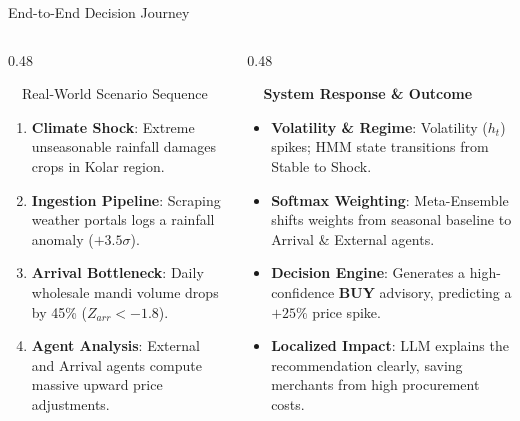 \documentclass{beamer}
\begin{document}
\begin{frame}{End-to-End Decision Journey}
\vspace{-0.2cm}

\begin{columns}[T]
    \begin{column}{0.48\textwidth}
        \begin{infocard}{~~Real-World Scenario Sequence}
            \fontsize{6.8pt}{8.5pt}\selectfont
            \begin{enumerate}\setlength\itemsep{3pt}\setlength\parskip{0pt}
                \item[\textbf{1.}] \textbf{Climate Shock}: Extreme unseasonable rainfall damages crops in Kolar region.
                \item[\textbf{2.}] \textbf{Ingestion Pipeline}: Scraping weather portals logs a rainfall anomaly ($+3.5\sigma$).
                \item[\textbf{3.}] \textbf{Arrival Bottleneck}: Daily wholesale mandi volume drops by 45\% ($Z_{arr} < -1.8$).
                \item[\textbf{4.}] \textbf{Agent Analysis}: External and Arrival agents compute massive upward price adjustments.
            \end{enumerate}
        \end{infocard}
    \end{column}
    
    \begin{column}{0.48\textwidth}
        \begin{smallcard}[0.98\textwidth, top=3pt, bottom=3pt, left=4pt, right=4pt, boxsep=0.5pt]
            \centering \textbf{\textcolor{primaryDark}{\small {}~~System Response \& Outcome}}
            \vspace{0.08cm}
            \fontsize{6.8pt}{8.2pt}\selectfont
            \begin{itemize}\setlength\itemsep{3pt}\setlength\parskip{0pt}
                \item \textbf{Volatility \& Regime}: Volatility ($h_t$) spikes; HMM state transitions from Stable to Shock.
                \item \textbf{Softmax Weighting}: Meta-Ensemble shifts weights from seasonal baseline to Arrival \& External agents.
                \item \textbf{Decision Engine}: Generates a high-confidence \textbf{BUY} advisory, predicting a $+25\%$ price spike.
                \item \textbf{Localized Impact}: LLM explains the recommendation clearly, saving merchants from high procurement costs.
            \end{itemize}
        \end{smallcard}
    \end{column}
\end{columns}


\end{frame}
\end{document}
